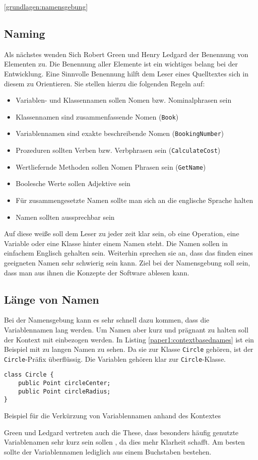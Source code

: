 \ref{grundlagen:namensgebung}

\subsection{Naming}
\label{paper1:naming}
Als nächstes wenden Sich Robert Green und Henry Ledgard der Benennung von Elementen zu\cite[S. 3f.]{Green}. Die Benennung aller Elemente ist ein wichtiges belang bei der Entwicklung. Eine Sinnvolle Benennung hilft dem Leser eines Quelltextes sich in diesem zu Orientieren. Sie stellen hierzu die folgenden Regeln auf\cite[S. 4]{Green}:
\begin{itemize}
    \item Variablen- und Klassennamen sollen Nomen bzw. Nominalphrasen sein
    \item Klassennamen sind zusammenfassende Nomen (\texttt{Book})
    \item Variablennamen sind exakte beschreibende Nomen (\texttt{BookingNumber})
    \item Prozeduren sollten Verben bzw. Verbphrasen sein (\texttt{CalculateCost})
    \item Wertliefernde Methoden sollen Nomen Phrasen sein (\texttt{GetName})
    \item Boolesche Werte sollen Adjektive sein
    \item Für zusammengesetzte Namen sollte man sich an die englische Sprache halten
    \item Namen sollten aussprechbar sein
\end{itemize}

Auf diese weiße soll dem Leser zu jeder zeit klar sein, ob eine Operation, eine Variable oder eine Klasse hinter einem Namen steht. Die Namen sollen in einfachem Englisch gehalten sein.
Weiterhin sprechen sie an, dass das finden eines geeigneten Namen sehr schwierig sein kann. Ziel bei der Namensgebung soll sein, dass man aus ihnen die Konzepte der Software ablesen kann.

\subsection{Länge von Namen}
Bei der Namensgebung kann es sehr schnell dazu kommen, dass die Variablennamen lang werden. Um Namen aber kurz und prägnant zu halten soll der Kontext mit einbezogen werden. In Listing \ref{paper1:contextbasednames} ist ein Beispiel mit zu langen Namen zu sehen. Da sie zur Klasse \texttt{Circle} gehören, ist der \texttt{Circle}-Präfix überflüssig. Die Variablen gehören klar zur \texttt{Circle}-Klasse.
\cite[S. 4f.]{Green}
\begin{listing}[H]
    \begin{verbatim}
class Circle {
    public Point circleCenter;
    public Point circleRadius;
}
    \end{verbatim}
    \caption{Beispiel für die Verkürzung von Variablennamen anhand des Kontextes}
    \label{paper1:contextbasednames}
\end{listing}
Green und Ledgard vertreten auch die These, dass besonders häufig genutzte Variablenamen sehr kurz sein sollen \cite[S. 6]{Green}, da dies mehr Klarheit schafft. Am besten sollte der Variablennamen lediglich aus einem Buchstaben bestehen.

